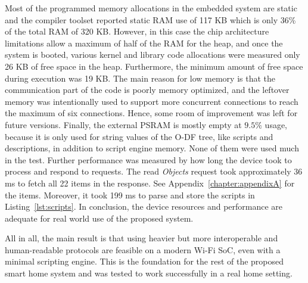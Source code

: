 Most of the programmed memory allocations in the embedded system are static and the compiler toolset reported static RAM use of 117 KB which is only 36\% of the total RAM of 320 KB. However, in this case the chip architecture limitations allow a maximum of half of the RAM for the heap, and once the system is booted, various kernel and library code allocations were measured only 26 KB of free space in the heap. Furthermore, the minimum amount of free space during execution was 19 KB. The main reason for low memory is that the communication part of the code is poorly memory optimized, and the leftover memory was intentionally used to support more concurrent connections to reach the maximum of six connections. Hence, some room of improvement was left for future versions. Finally, the external PSRAM is mostly empty at $9.5\%$ usage, because it is only used for string values of the O-DF tree, like scripts and descriptions, in addition to script engine memory. None of them were used much in the test. Further performance was measured by how long the device took to process and respond to requests. The read \emph{Objects} request took approximately 36 ms to fetch all 22 items in the response. See Appendix~\ref{chapter:appendixA} for the items. Moreover, it took 199 ms to parse and store the scripts in Listing~\ref{lst:scripts}. In conclusion, the device resources and performance are adequate for real world use of the proposed system.





All in all, the main result is that using heavier but more interoperable and human-readable protocols are feasible on a modern Wi-Fi SoC, even with a minimal scripting engine. This is the foundation for the rest of the proposed smart home system and was tested to work successfully in a real home setting.






